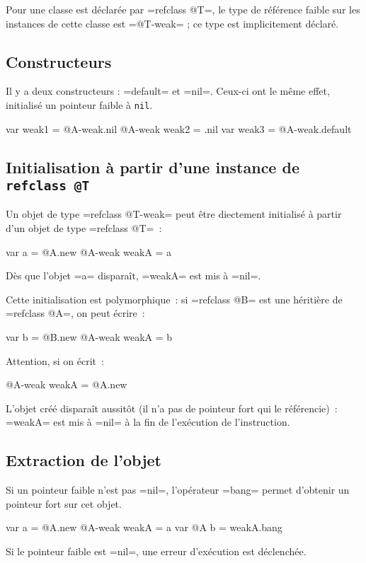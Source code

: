 Pour une classe est déclarée par \ggst=refclass @T=, le type de référence faible sur les instances de cette classe est \ggst=@T-weak= ; ce type est implicitement déclaré.







\subsection{Constructeurs}

Il y a deux constructeurs : \ggst=default= et \ggst=nil=. Ceux-ci ont le même effet, initialisé un pointeur faible à \texttt{nil}.

\begin{galgas3}
  var weak1 = @A-weak.nil
  @A-weak weak2 = .nil
  var weak3 = @A-weak.default
\end{galgas3}


\subsection{Initialisation à partir d'une instance de \texttt{refclass @T}}

Un objet de type \ggst=refclass @T-weak= peut être diectement initialisé à partir d'un objet de type \ggst=refclass @T=~:
\begin{galgas3}
  var a = @A.new
  @A-weak weakA = a
\end{galgas3}

Dès que l'objet \ggst=a= disparaît, \ggst=weakA= est mis à \ggst=nil=.

Cette initialisation est polymorphique~: si \ggst=refclass @B= est une héritière de \ggst=refclass @A=, on peut écrire~:
\begin{galgas3}
  var b = @B.new
  @A-weak weakA = b
\end{galgas3}

Attention, si on écrit~:
\begin{galgas3}
  @A-weak weakA = @A.new
\end{galgas3}
L'objet créé disparaît aussitôt (il n'a pas de pointeur fort qui le référencie)~: \ggst=weakA= est mis à \ggst=nil= à la fin de l'exécution de l'instruction.


\subsection{Extraction de l'objet}

Si un pointeur faible n'est pas \ggst=nil=, l'opérateur \ggst=bang= permet d'obtenir un pointeur fort sur cet objet.
\begin{galgas3}
  var a = @A.new
  @A-weak weakA = a
  var @A b = weakA.bang
\end{galgas3}
Si le pointeur faible est \ggst=nil=, une erreur d'exécution est déclenchée.



